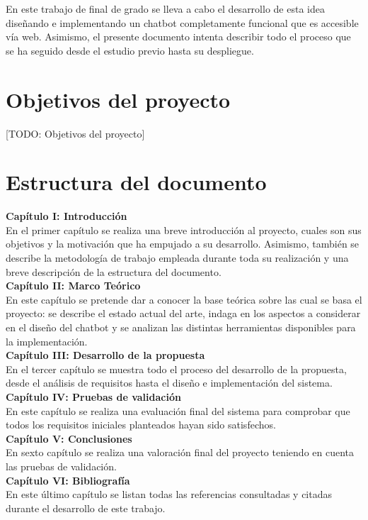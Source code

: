En este trabajo de final de grado se lleva a cabo el desarrollo de esta idea diseñando e implementando un chatbot completamente funcional que es accesible vía web. Asimismo, el presente documento intenta describir todo el proceso que se ha seguido desde el estudio previo hasta su despliegue.



\section{Objetivos del proyecto}
[TODO: Objetivos del proyecto]

\section{Estructura del documento}
\noindent \textbf{Capítulo I: Introducción}\\
En el primer capítulo se realiza una breve introducción al proyecto, cuales son sus objetivos y la motivación que ha empujado a su desarrollo. Asimismo, también se describe la metodología de trabajo empleada durante toda su realización y una breve descripción de la estructura del documento.  \\

\noindent \textbf{Capítulo II: Marco Teórico}\\
En este capítulo se pretende dar a conocer la base teórica sobre las cual se basa el proyecto: se describe el estado actual del arte, indaga en los aspectos a considerar en el diseño del chatbot y se analizan las distintas herramientas disponibles para la implementación.\\

\noindent \textbf{Capítulo III: Desarrollo de la propuesta}\\
En el tercer capítulo se muestra todo el proceso del desarrollo de la propuesta, desde el análisis de requisitos hasta el diseño e implementación del sistema. \\

\noindent \textbf{Capítulo IV: Pruebas de validación}\\
En este capítulo se realiza una evaluación final del sistema para comprobar que todos los requisitos iniciales planteados hayan sido satisfechos.\\

\noindent \textbf{Capítulo V: Conclusiones}\\
En sexto capítulo se realiza una valoración final del proyecto teniendo en cuenta las pruebas de validación.\\

\noindent \textbf{Capítulo VI: Bibliografía}\\
En este último capítulo se listan todas las referencias consultadas y citadas durante el desarrollo de este trabajo.\\